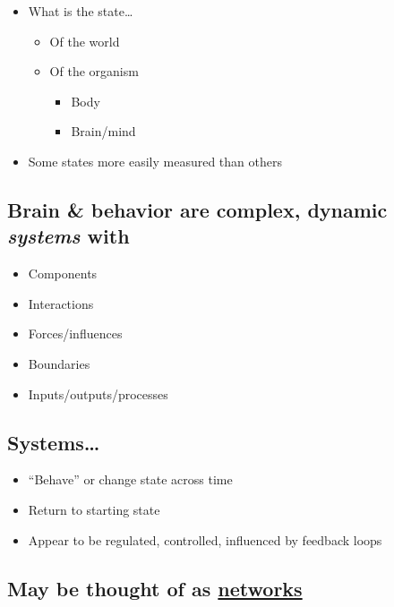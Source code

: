 \documentclass[]{article}
\providecommand{\tightlist}{%
  \setlength{\itemsep}{0pt}\setlength{\parskip}{0pt}}
\begin{document}
\begin{itemize}
\tightlist
\item
  What is the state\ldots{}

  \begin{itemize}
  \tightlist
  \item
    Of the world
  \item
    Of the organism

    \begin{itemize}
    \tightlist
    \item
      Body
    \item
      Brain/mind
    \end{itemize}
  \end{itemize}
\item
  Some states more easily measured than others
\end{itemize}

\subsection{\texorpdfstring{Brain \& behavior are complex, dynamic
\emph{systems}
with}{Brain \& behavior are complex, dynamic systems with}}\label{brain-behavior-are-complex-dynamic-systems-with}

\begin{itemize}
\tightlist
\item
  Components
\item
  Interactions
\item
  Forces/influences
\item
  Boundaries
\item
  Inputs/outputs/processes
\end{itemize}

\subsection{Systems\ldots{}}\label{systems}

\begin{itemize}
\tightlist
\item
  ``Behave'' or change state across time
\item
  Return to starting state
\item
  Appear to be regulated, controlled, influenced by feedback loops
\end{itemize}

\subsection{\texorpdfstring{May be thought of as
\href{https://en.wikipedia.org/wiki/Network_science}{networks}}{May be thought of as networks}}\label{may-be-thought-of-as-networks}
\end{document}
